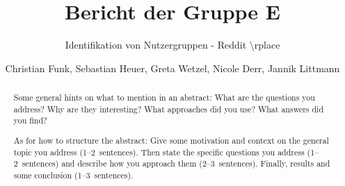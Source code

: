 \title{Bericht der Gruppe E}
\subtitle{Identifikation von Nutzergruppen - Reddit \textbackslash rplace}         %


\author{Christian Funk, Sebastian Heuer, Greta Wetzel, Nicole Derr, Jannik Littmann}

\begin{abstract}
 Some general hints on what to mention in an abstract: What are the questions you address? Why are they interesting? What approaches did you use? What answers did you find?
 
 As for how to structure the abstract: Give some motivation and context on the general topic you address (1--2~sentences). Then state the specific questions you address (1--2~sentences) and describe how you approach them (2--3~sentences). Finally, results and some conclusion (1--3~sentences).
\end{abstract}

\maketitle
